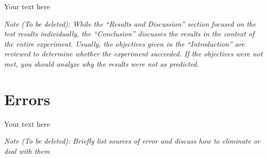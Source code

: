 \documentclass[10pt]{article}
\begin{document}
	Your text here
	
	\medskip
	
	\textit{Note (To be deleted): While the ``Results and Discussion'' section focused on the test results individually, the ``Conclusion'' discusses the results in the context of the entire experiment. Usually, the objectives given in the ``Introduction'' are reviewed to determine whether the experiment succeeded. If the objectives were not met, you should analyze why the results were not as predicted.}
	
	\section{Errors}
	
	Your text here
	
	\medskip
	
	\textit{Note (To be deleted): Briefly list sources of error and discuss how to eliminate or deal with them}
	
\end{document}
